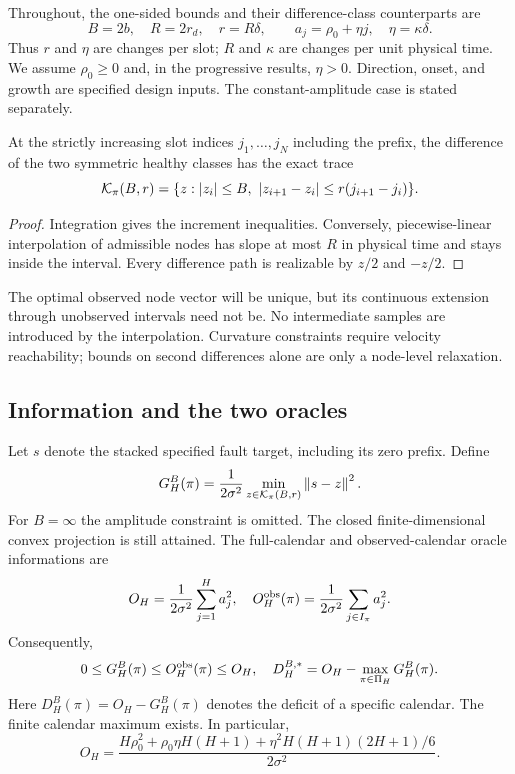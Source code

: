 Throughout, the one-sided bounds and their difference-class counterparts are
\begin{equation}
 B=2b,\quad R=2r_d,\quad r=R\delta,
 \qquad a_j=\rho_0+\eta j,\quad\eta=\kappa\delta.\label{eq:units}
\end{equation}
Thus $r$ and $\eta$ are changes per slot; $R$ and $\kappa$ are changes per unit physical time. We assume $\rho_0\ge0$ and, in the progressive results, $\eta>0$. Direction, onset, and growth are specified design inputs. The constant-amplitude case is stated separately.

\begin{lemma}\label{lem:trace}
At the strictly increasing slot indices $j_1,\ldots,j_N$ including the prefix, the difference of the two symmetric healthy classes has the exact trace
\begin{equation}
 \mathcal K_\pi(B,r)=\{z: |z_i|\le B,\ |z_{i+1}-z_i|\le r(j_{i+1}-j_i)\}.
 \label{eq:K}
\end{equation}
\end{lemma}
\begin{proof}
Integration gives the increment inequalities. Conversely, piecewise-linear interpolation of admissible nodes has slope at most $R$ in physical time and stays inside the interval. Every difference path is realizable by $z/2$ and $-z/2$.\end{proof}
The optimal observed node vector will be unique, but its continuous extension through unobserved intervals need not be. No intermediate samples are introduced by the interpolation. Curvature constraints require velocity reachability; bounds on second differences alone are only a node-level relaxation.

\subsection{Information and the two oracles}
Let $s$ denote the stacked specified fault target, including its zero prefix. Define
\begin{equation}
 G_H^B(\pi)=\frac1{2\sigma^2}\min_{z\in\mathcal K_\pi(B,r)}\left\lVert s-z\right\rVert^2.\label{eq:G}
\end{equation}
For $B=\infty$ the amplitude constraint is omitted. The closed finite-dimensional convex projection is still attained. The full-calendar and observed-calendar oracle informations are
\begin{equation}
 O_H=\frac1{2\sigma^2}\sum_{j=1}^Ha_j^2,
 \quad O_H^{\rm obs}(\pi)=\frac1{2\sigma^2}\sum_{j\in I_\pi}a_j^2.
\end{equation}
Consequently,
\begin{equation}
0\le G_H^B(\pi)\le O_H^{\rm obs}(\pi)\le O_H,
\quad D_H^{B,*}=O_H-\max_{\pi\in\Pi_H}G_H^B(\pi).\label{eq:D}
\end{equation}
Here $D_H^B(\pi)=O_H-G_H^B(\pi)$ denotes the deficit of a specific calendar. The finite calendar maximum exists. In particular,
\begin{equation}
 O_H=\frac{H\rho_0^2+\rho_0\eta H(H+1)+\eta^2H(H+1)(2H+1)/6}{2\sigma^2}.
 \label{eq:oracle}
\end{equation}

